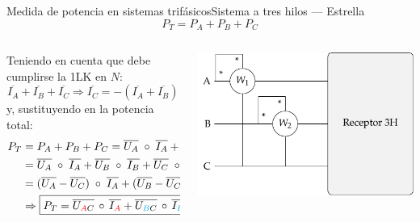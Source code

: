 \documentclass[aspectratio=169, xcolor={usenames,svgnames,dvipsnames}]{beamer}
\begin{document}
\begin{frame}{Medida de potencia en sistemas trifásicos}{Sistema a tres hilos --- Estrella}
\begin{equation*}
	    P_T=P_A+P_B+P_C
	\end{equation*}
	\begin{columns}
	\begin{column}{0.6\linewidth}
Teniendo en cuenta que debe cumplirse la 1LK en $N$:
	\begin{equation*}
	    \overline{I_A}+\overline{I_B}+\overline{I_C}\Rightarrow \overline{I_C}=-(\overline{I_A}+\overline{I_B})
	\end{equation*}
	y, sustituyendo en la potencia total: 
	\begin{align*}
	    P_T&=P_A+P_B+P_C=\overline{U_{A}}\;\circ\; \overline{I_A} + \overline{U_{B}}\;\circ\; \overline{I_B} + \overline{U_{C}}\;\circ\,\overline{I_C}=\\
	    &=\overline{U_{A}}\;\circ\; \overline{I_A}+\overline{U_{B}}\;\circ\; \overline{I_B}+\overline{U_{C}}\;\circ\left(-(\overline{I_A}+\overline{I_B})\right)=\nonumber \\
	    & =(\overline{U_A}-\overline{U_C})\;\circ\; \overline{I_A}+(\overline{U_B}-\overline{U_C})\;\circ\; \overline{I_B}\Rightarrow \\
	    &\Rightarrow \boxed{P_T=\overline{U_{\textcolor{red}{A}C}}\,\circ\,\overline{I_{\textcolor{red}{A}}}+\overline{U_{\textcolor{cyan}{B}C}}\,\circ\,\overline{I_{\textcolor{cyan}{B}}}}
	\end{align*}
	\end{column}
	\begin{column}{0.4\linewidth}
	\begin{center}
\includegraphics[width=\linewidth]{../figs/Potencia3H.pdf}
\end{center}
	\end{column}
	\end{columns}
	
\end{frame}
\end{document}
